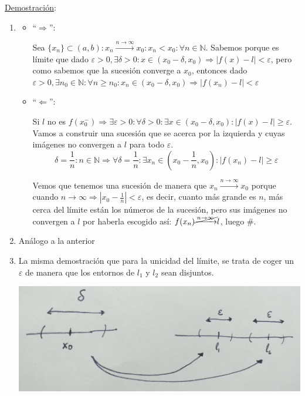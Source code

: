 \documentclass[10pt,a4paper,openright]{book}
\begin{document}
\underline{Demostración}:
\begin{enumerate}
\item 
	\begin{itemize}
	\item ``$\Rightarrow$'':\par
	Sea $\{x_n\}\subset (a,b):  x_n\xrightarrow{n\rightarrow \infty} x_0: x_n< x_0: \forall n\in \mathbb N$. Sabemos porque es límite que dado $\varepsilon>0, \exists \delta>0: x\in(x_0-\delta, x_0)\Rightarrow |f(x)-l|<\varepsilon$, pero como sabemos que la sucesión converge a $x_0$, entonces dado $\varepsilon>0, \exists n_0\in \mathbb N: \forall n\geq n_0: x_n\in (x_0-\delta, x_0)\Rightarrow |f(x_n)-l|<\varepsilon$
	
	\item ``$\Leftarrow$'':\par
	Si $l$ no es $f(x_0^-)\Rightarrow \exists \varepsilon>0:\forall \delta>0: \exists x\in(x_0-\delta, x_0): |f(x)-l|\geq \varepsilon$. Vamos a construir una sucesión que se acerca por la izquierda y cuyas imágenes no convergen a $l$ para todo $\varepsilon$.
	$$\delta=\frac{1}{n}: n\in \mathbb N \Rightarrow \forall \delta=\frac{1}{n} : \exists x_n\in \left(x_0-\frac{1}{n}, x_0\right): |f(x_n)-l|\geq \varepsilon $$
	
	Vemos que tenemos una sucesión de manera que $ x_n\xrightarrow{n\rightarrow \infty} x_0$ porque cuando $n\rightarrow \infty\Rightarrow |x_0-\frac{1}{n}|<\varepsilon$, es decir, cuanto más grande es $n$, más cerca del límite están los números de la sucesión, pero sus imágenes no convergen a $l$ por haberla escogido así: $f(x_n)\cancel{\xrightarrow{n\rightarrow \infty}}l$, luego \#.
	\end{itemize}
	
\item Análogo a la anterior

\item La misma demostración que para la unicidad del límite, se trata de coger un $\varepsilon$ de manera que los entornos de $l_1$ y $l_2$ sean disjuntos.

\begin{center}
\includegraphics[scale=0.25]{unicidad limite lateral}
\end{center}

\end{enumerate}
\end{document}
